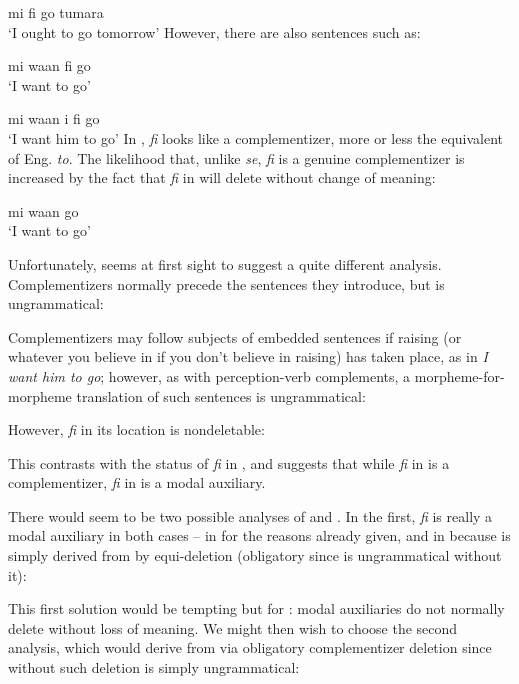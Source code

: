 \ea\label{ex:2:187}
mi fi go tumara\\
\glt `I ought to go tomorrow'
\z
However, there are also sentences such as:

\ea\label{ex:2:188}
mi waan fi go\\
\glt `I want to go'
\z

\ea\label{ex:2:189}
 mi waan i fi go\\
\glt `I want him to go'
\z
In , \textit{fi} looks like a complementizer, more or less the equivalent of Eng. \textit{to}. The likelihood that, unlike \textit{se}, \textit{fi} is a genuine complementizer is increased by the fact that \textit{fi} in  will delete without change of meaning:

\ea\label{ex:2:190}
 mi waan go \\
\glt `I want to go'
\z

Unfortunately,  seems at first sight to suggest a quite different analysis. Complementizers normally precede the sentences they introduce, but  is ungrammatical:

\z

Complementizers may follow subjects of embedded sentences if raising (or whatever you believe in if you don't believe in raising) has taken place, as in \textit{I want him to go}; however, as with perception-verb complements, a morpheme-for-morpheme translation of such sentences is ungrammatical:

\glt
\z

However, \textit{fi} in its  location is nondeletable:

\z
This contrasts with the status of \textit{fi} in , and suggests that while
\textit{fi} in  is a complementizer, \textit{fi} in  is a modal auxiliary.

There would seem to be two possible analyses of  and . In the first, \textit{fi} is really a modal auxiliary in both cases -- in  for the reasons already given, and in  because  is simply derived from  by equi-deletion (obligatory since  is ungrammatical without it):

\z

This first solution would be tempting but for : modal auxiliaries do not normally delete without loss of meaning. We might then wish to choose the second analysis, which would derive  from  via obligatory complementizer deletion since without such deletion  is simply ungrammatical:

